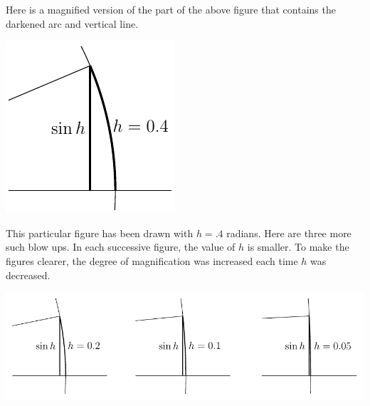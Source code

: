 \noindent Here is a magnified version of the part of the above figure
that contains the darkened arc and vertical line.

\begin{efig}
\begin{center}
     \includegraphics{sinDeriv2}
\end{center}
\end{efig}


\noindent This particular figure has been drawn with $h=.4$ radians.
Here are three more such blow ups. In  each successive figure, the
value of $h$ is smaller.
To make the figures clearer, the degree of magnification was increased
each time $h$ was decreased.

\begin{wfig}
\begin{center}
     \includegraphics{sinDeriv345}
\end{center}
\end{wfig}

